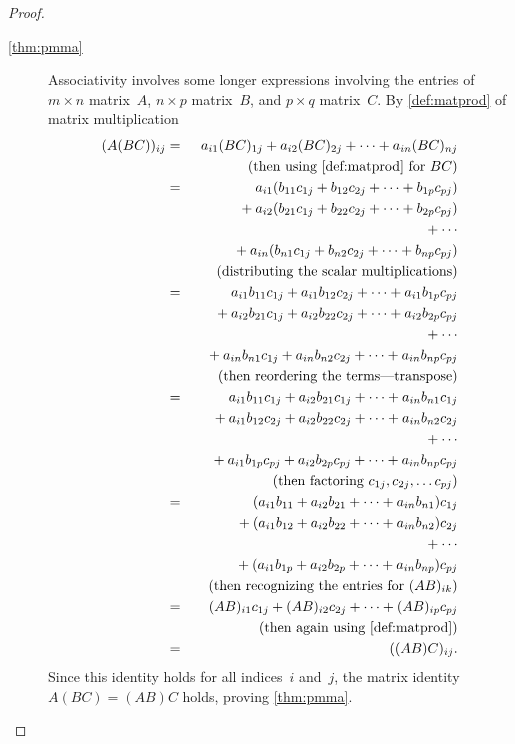 \begin{proof}
\begin{description}
\item[\ref{thm:pmma}] Associativity involves some longer expressions involving the entries of \(m\times n\) matrix~\(A\), \(n\times p\) matrix~\(B\), and \(p\times q\) matrix~\(C\). 
By \autoref{def:matprod} of matrix multiplication
\begin{eqnarray*}
(A(BC))_{ij}&=& a_{i1}(BC)_{1j}+a_{i2}(BC)_{2j}+\cdots+a_{in}(BC)_{nj}
\\&&\quad(\text{then using  \autoref{def:matprod} for }BC)
\\&=&\phantom{{}+{}}a_{i1}(b_{11}c_{1j}+b_{12}c_{2j}+\cdots+b_{1p}c_{pj})
\\&&{}+a_{i2}(b_{21}c_{1j}+b_{22}c_{2j}+\cdots+b_{2p}c_{pj})
\\&&{}+\cdots
\\&&{}+a_{in}(b_{n1}c_{1j}+b_{n2}c_{2j}+\cdots+b_{np}c_{pj})
\\&&{}\quad(\text{distributing the scalar multiplications})
\\&=&\phantom{{}+{}}a_{i1}b_{11}c_{1j}+a_{i1}b_{12}c_{2j}+\cdots+a_{i1}b_{1p}c_{pj}
\\&&{}+a_{i2}b_{21}c_{1j}+a_{i2}b_{22}c_{2j}+\cdots+a_{i2}b_{2p}c_{pj}
\\&&{}+\cdots
\\&&{}+a_{in}b_{n1}c_{1j}+a_{in}b_{n2}c_{2j}+\cdots+a_{in}b_{np}c_{pj}
\\&&{}\quad(\text{then reordering the terms---transpose})
\\&=&\phantom{{}+{}}a_{i1}b_{11}c_{1j}+a_{i2}b_{21}c_{1j}+\cdots+a_{in}b_{n1}c_{1j}
\\&&{}+a_{i1}b_{12}c_{2j}+a_{i2}b_{22}c_{2j}+\cdots+a_{in}b_{n2}c_{2j}
\\&&{}+\cdots
\\&&{}+a_{i1}b_{1p}c_{pj}+a_{i2}b_{2p}c_{pj}+\cdots+a_{in}b_{np}c_{pj}
\\&&{}\quad(\text{then factoring }c_{1j},c_{2j},\ldots c_{pj})
\\&=&\phantom{{}+{}}(a_{i1}b_{11}+a_{i2}b_{21}+\cdots+a_{in}b_{n1})c_{1j}
\\&&{}+(a_{i1}b_{12}+a_{i2}b_{22}+\cdots+a_{in}b_{n2})c_{2j}
\\&&{}+\cdots
\\&&{}+(a_{i1}b_{1p}+a_{i2}b_{2p}+\cdots+a_{in}b_{np})c_{pj}
\\&&{}\quad(\text{then recognizing the entries for }(AB)_{ik})
\\&=&(AB)_{i1}c_{1j} +(AB)_{i2}c_{2j} +\cdots +(AB)_{ip}c_{pj}
\\&&{}\quad(\text{then again using  \autoref{def:matprod}})
\\&=&((AB)C)_{ij}.
\end{eqnarray*}
Since this identity holds for all indices~\(i\) and~\(j\), the matrix identity \(A(BC)=(AB)C\) holds, proving \autoref{thm:pmma}.


\end{description}
\end{proof}
